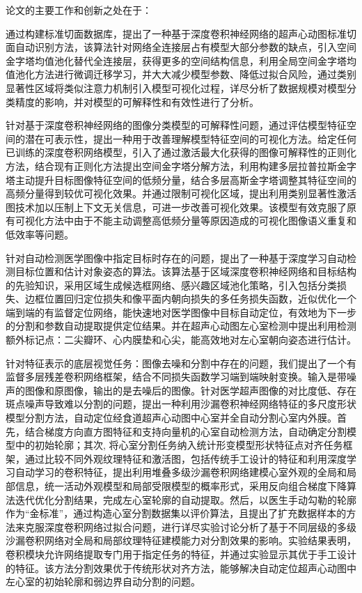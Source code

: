 论文的主要工作和创新之处在于：

通过构建标准切面数据库，提出了一种基于深度卷积神经网络的超声心动图标准切面自动识别方法，该算法针对网络全连接层占有模型大部分参数的缺点，引入空间金字塔均值池化替代全连接层，获得更多的空间结构信息，利用全局空间金字塔均值池化方法进行微调迁移学习，并大大减少模型参数、降低过拟合风险，通过类别显著性区域将类似注意力机制引入模型可视化过程，详尽分析了数据规模对模型分类精度的影响，并对模型的可解释性和有效性进行了分析。

针对基于深度卷积神经网络的图像分类模型的可解释性问题，通过评估模型特征空间的潜在可表示性，提出一种用于改善理解模型特征空间的可视化方法。给定任何已训练的深度卷积网络模型，引入了通过激活最大化获得的图像可解释性的正则化方法，结合现有正则化方法提出空间金字塔分解方法，利用构建多层拉普拉斯金字塔主动提升目标图像特征空间的低频分量，结合多层高斯金字塔调整其特征空间的高频分量得到较优可视化效果。并通过限制可视化区域，提出利用类别显著性激活图技术加以压制上下文无关信息，可进一步改善可视化效果。该模型有效克服了原有可视化方法中由于不能主动调整高低频分量等原因造成的可视化图像语义重复和低效率等问题。

针对自动检测医学图像中指定目标时存在的问题，提出了一种基于深度学习自动检测目标位置和估计对象姿态的算法。该算法基于区域深度卷积神经网络和目标结构的先验知识，采用区域生成候选框网络、感兴趣区域池化策略，引入包括分类损失、边框位置回归定位损失和像平面内朝向损失的多任务损失函数，近似优化一个端到端的有监督定位网络，能快速地对医学图像中目标自动定位，有效地为下一步的分割和参数自动提取提供定位结果。并在超声心动图左心室检测中提出利用检测额外标记点：二尖瓣环、心内膜垫和心尖，能高效地对左心室朝向姿态进行估计。

针对特征表示的底层视觉任务：图像去噪和分割中存在的问题，我们提出了一个有监督多层残差卷积网络框架，结合不同损失函数学习端到端映射变换。输入是带噪声的图像和原图像，输出的是去噪后的图像。针对医学超声图像的对比度低、存在斑点噪声导致难以分割的问题，提出一种利用沙漏卷积神经网络特征的多尺度形状模型分割方法，自动定位经食道超声心动图中心室并全自动分割心室内外膜。首先，结合梯度方向直方图特征和支持向量机的心室自动检测方法，自动确定分割模型中的初始轮廓；其次, 将心室分割任务纳入统计形变模型形状特征点对齐任务框架，通过比较不同外观纹理特征和激活图，包括传统手工设计的特征和利用深度学习自动学习的卷积特征，提出利用堆叠多级沙漏卷积网络建模心室外观的全局和局部信息，统一活动外观模型和局部受限模型的概率形式，采用反向组合梯度下降算法迭代优化分割结果，完成左心室轮廓的自动提取。然后，以医生手动勾勒的轮廓作为“金标准”，通过构造心室分割数据集以评价算法，且提出了扩充数据样本的方法来克服深度卷积网络过拟合问题，进行详尽实验讨论分析了基于不同层级的多级沙漏卷积网络对全局和局部纹理特征建模能力对分割效果的影响。实验结果表明，卷积模块允许网络提取专门用于指定任务的特征，并通过实验显示其优于手工设计的特征。该方法分割效果优于传统形状对齐方法，能够解决自动定位超声心动图中左心室的初始轮廓和弱边界自动分割的问题。


